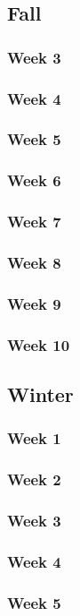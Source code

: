 \documentclass[letterpaper,10pt,serif,draftclsnofoot,onecolumn,compsoc,titlepage]{IEEEtran}
\begin{document}
\subsection{Fall}
\subsubsection{Week 3}
\subsubsection{Week 4}
\subsubsection{Week 5}
\subsubsection{Week 6}
\subsubsection{Week 7}
\subsubsection{Week 8}
\subsubsection{Week 9}
\subsubsection{Week 10}
\subsection{Winter}
\subsubsection{Week 1}
\subsubsection{Week 2}
\subsubsection{Week 3}
\subsubsection{Week 4}
\subsubsection{Week 5}
\end{document}
